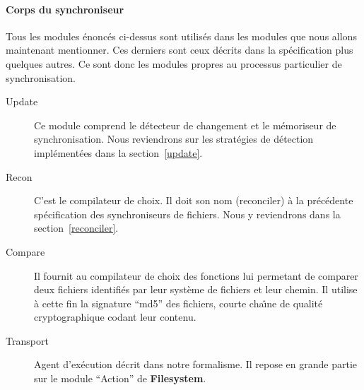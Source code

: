 \documentclass[11pt]{report}
\newcommand{\modu}[1]{\textbf{#1}}
\begin{document}
{\paragraph{Corps du synchroniseur\\}
Tous les modules \'enonc\'es ci-dessus sont utilis\'es dans les modules que
nous allons maintenant mentionner. Ces derniers sont ceux d\'ecrits dans la
sp\'ecification plus quelques autres. Ce sont donc les modules propres au
processus particulier de synchronisation.
\begin{description}
\item [Update] Ce module comprend le d\'etecteur de changement et le
  m\'emoriseur de synchronisation. Nous reviendrons sur les strat\'egies 
de d\'etection impl\'ement\'ees dans la section~\ref{update}.
\item [Recon] C'est le compilateur de choix. Il doit son nom (reconciler) 
\`a la pr\'ec\'edente sp\'ecification des synchroniseurs de fichiers. Nous
y reviendrons dans la section~\ref{reconciler}.
\item [Compare] Il fournit au compilateur de choix des fonctions lui
permetant de comparer deux fichiers identifi\'es par leur syst\`eme de
fichiers et leur chemin. Il utilise \`a cette fin la signature ``md5''
des fichiers, courte cha\^{\i}ne de qualit\'e cryptographique codant
leur contenu.
\item [Transport] Agent d'ex\'ecution d\'ecrit dans notre formalisme.
Il repose en grande partie sur le module ``Action'' de \modu{Filesystem}.
\end{description}
}
\end{document}
